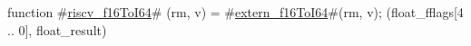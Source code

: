 function #\hyperref[sailRISCVzriscvzyf16ToI64]{riscv\_f16ToI64}# (rm, v) = {
  #\hyperref[sailRISCVzexternzyf16ToI64]{extern\_f16ToI64}#(rm, v);
  (float_fflags[4 .. 0], float_result)
}
